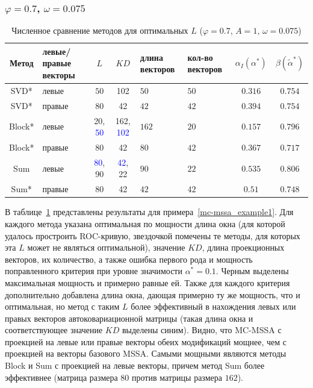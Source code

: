 \documentclass[specialist,
substylefile = spbu_report.rtx,
subf,href,colorlinks=true, 12pt]{disser}
\theoremstyle{definition}
\begin{document}
\subsubsection{$\varphi=0.7$, $\omega=0.075$}
\begin{table}[h]
	\caption{Численное сравнение методов для оптимальных $L$ ($\varphi=0.7$, $A=1$, $\omega=0.075$)}
	\label{tab:res_mc-ssa}
	\centering
	\begin{tabular}{|c>{\centering\arraybackslash}m{1in}cc>{\centering\arraybackslash}m{1in} >{\centering\arraybackslash}m{0.8in}cc|}\hline
		Метод & левые/правые векторы & $L$ & $KD$ & длина векторов & кол-во векторов & $\alpha_I(\alpha^*)$ & $\beta(\widetilde\alpha^*)$ \\
		\hline
		SVD* & левые & $50$ &102& $50$ & $50$ & $0.316$ & $0.754$\\
		\hline
		SVD* & правые & $80$ &42& $42$ & $42$ & $0.394$ & $0.754$\\
		\hline
		Block* & левые & 20, \textcolor{blue}{50} & 162, \textcolor{blue}{102} & $162$ & $20$ & $0.157$ & $\mathbf{0.796}$ \\
		\hline
		Block* & правые & $80$ &42& $80$ & $42$ & $0.367$ & $0.717$\\
		\hline
		Sum & левые & \textcolor{blue}{80}, 90 & \textcolor{blue}{42}, 22& $90$ & $22$ & $0.535$ & $\mathbf{0.806}$ \\
		\hline
		Sum* & правые & $80$ &42& $42$ & $42$ & $0.51$ & $0.748$ \\
		\hline
	\end{tabular}
\end{table}
В таблице~\ref{tab:res_mc-ssa} представлены результаты для примера~\ref{mc-mssa_example1}. Для каждого метода указана оптимальная по мощности длина окна (для которой удалось простроить ROC-кривую, звездочкой помечены те методы, для которых эта $L$ может не являться оптимальной), значение $KD$, длина проекционных векторов, их количество, а также ошибка первого рода и мощность поправленного критерия при уровне значимости $\alpha^*=0.1$. Черным выделены максимальная мощность и примерно равные ей. Также для каждого критерия дополнительно добавлена длина окна, дающая примерно ту же мощность, что и оптимальная, но метод с таким $L$ более эффективный в нахождения левых или правых векторов автоковариационной матрицы (такая длина окна и соответствующее значение $KD$ выделены синим). Видно, что MC-MSSA с проекцией на левые или правые векторы обеих модификаций мощнее, чем с проекцией на векторы базового MSSA. Самыми мощными являются методы Block и Sum с проекцией на левые векторы, причем метод Sum более эффективнее (матрица размера $80$ против матрицы размера $162$).
\end{document}
